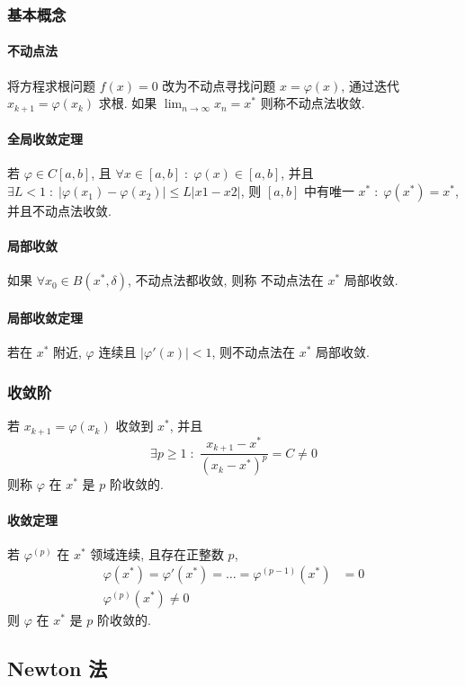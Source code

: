 \documentclass{ctexart}
\begin{document}
\subsubsection{基本概念}
\paragraph{不动点法}
    将方程求根问题 $f(x) = 0$ 改为不动点寻找问题 $x = \varphi(x)$,
    通过迭代 $x_{k+1} = \varphi(x_k)$ 求根.
    如果 $\lim_{n\to\infty} x_n = x^*$ 则称不动点法收敛.
\paragraph{全局收敛定理}
    若 $\varphi \in C[a, b]$, 且 $\forall x \in [a,b]\;:\; \varphi(x) \in [a,b]$,
    并且 $\exists L < 1\;:\; |\varphi(x_1) - \varphi(x_2)| \le L |x1 - x2|$,
    则 $[a,b]$ 中有唯一 $x^*\;:\;\varphi(x^*) = x^*$, 并且不动点法收敛.
\paragraph{局部收敛}
    如果 $\forall x_0 \in B(x^*, \delta)$, 不动点法都收敛, 则称
    不动点法在 $x^*$ 局部收敛.
\paragraph{局部收敛定理}
    若在 $x^*$ 附近, $\varphi$ 连续且 $|\varphi'(x)| < 1$, 则不动点法在 $x^*$ 局部收敛.
\subsubsection{收敛阶}
    若 $x_{k+1} = \varphi(x_k)$ 收敛到 $x^*$, 并且 \[
        \exists p \ge 1\;:\;\frac{x_{k+1} - x^*}{(x_k - x^*)^p} = C \neq 0\]
    则称 $\varphi$ 在 $x^*$ 是 $p$ 阶收敛的.
\paragraph{收敛定理}
    若 $\varphi^{(p)}$ 在 $x^*$ 领域连续, 且存在正整数 $p$, \begin{align*}
        \varphi(x^*) = \varphi'(x^*) = \ldots = \varphi^{(p-1)}(x^*) &= 0\\
        \varphi^{(p)}(x^*) \neq 0
    \end{align*}
    则 $\varphi$ 在 $x^*$ 是 $p$ 阶收敛的.


\subsection{Newton 法}
\end{document}
